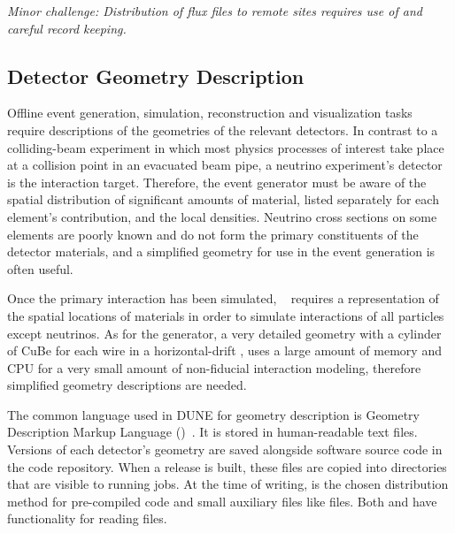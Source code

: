 \documentclass[../main-v1.tex]{subfiles}
\begin{document}
{\it Minor challenge:  Distribution of flux files to remote sites requires use of  and careful record keeping.}

\subsection{Detector Geometry Description }
\label{sec:usecases:detectorgeometry}

Offline event generation, simulation, reconstruction and visualization tasks require descriptions of the geometries of the relevant detectors.  In contrast to a colliding-beam experiment in which most physics processes of interest take place at a collision point in an evacuated beam pipe, a neutrino experiment's detector is the interaction target.  Therefore, the event generator must be aware of the spatial distribution of significant amounts of material, listed separately for each element's contribution, and the local densities.  Neutrino cross sections on some elements are poorly known and do not form the primary constituents of the detector materials, and a simplified geometry for use in the event generation is often useful.

Once the primary interaction has been simulated, ~\cite{geant4} requires a representation of the spatial locations of materials in order to simulate interactions of all particles except neutrinos.  As for the generator, a very detailed geometry with a cylinder of CuBe for each wire in a horizontal-drift , uses a large amount of memory and CPU for a very small amount of non-fiducial interaction modeling, therefore %
simplified geometry descriptions are needed.

The common language used in DUNE for geometry description is Geometry Description Markup Language ()~\cite{gdml}.  It is stored in human-readable text files.  Versions of each detector's geometry are saved alongside software source code in the code repository.  When a release is built, these  files are copied into directories that are visible to running jobs.  At the time of writing,  is the chosen distribution method for pre-compiled code and small auxiliary files like  files.   Both  and  have functionality for reading  files.
\end{document}
